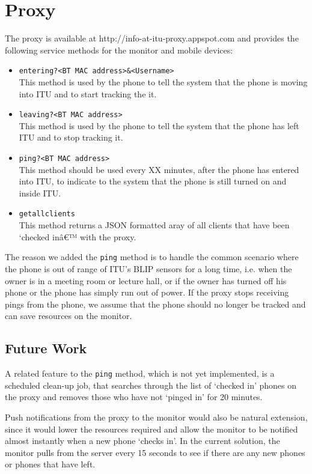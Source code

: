 \documentclass{ubicomp2011}
\begin{document}
\section{Proxy}
The proxy is available at http://info-at-itu-proxy.appspot.com and provides the following service methods for the monitor and mobile devices:

\begin{itemize}
\item \texttt{entering?<BT MAC address>\&<Username>}\\
This method is used by the phone to tell the system that the phone is moving into ITU and to start tracking the it.
\item \texttt{leaving?<BT MAC address>}\\
This method is used by the phone to tell the system that the phone has left ITU and to stop tracking it.
\item \texttt{ping?<BT MAC address>}\\
This method should be used every XX minutes, after the phone has entered into ITU, to indicate to the system that the phone is still turned on and inside ITU.
\item \texttt{getallclients}\\
This method returns a JSON formatted aray of all clients that have been `checked inâ€™ with the proxy.
\end{itemize}

The reason we added the \texttt{ping} method is to handle the common scenario where the phone is out of range of ITU's BLIP sensors for a long time, i.e. when the owner is in a meeting room or lecture hall, or if the owner has turned off his phone or the phone has simply run out of power. If the proxy stops receiving pings from the phone, we assume that the phone should no longer be tracked and can save resources on the monitor.

\subsection{Future Work}
A related feature to the \texttt{ping} method, which is not yet implemented, is a scheduled clean-up job, that searches through the list of `checked in' phones on the proxy and removes those who have not `pinged in' for 20 minutes.

Push notifications from the proxy to the monitor would also be natural extension, since it would lower the resources required and allow the monitor to be notified almost instantly when a new phone `checks in'. In the current solution, the monitor pulls from the server every 15 seconds to see if there are any new phones or phones that have left.
\end{document}
